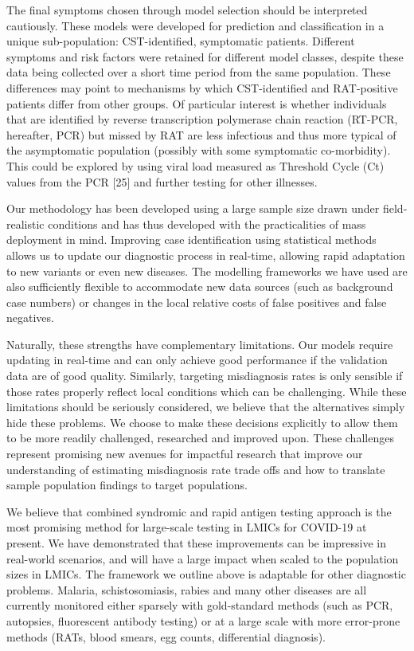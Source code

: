 \documentclass[]{elsarticle} %
\begin{document}
The final symptoms chosen through model selection should be interpreted cautiously.
These models were developed for prediction and classification in a unique sub-population: CST-identified, symptomatic patients.
Different symptoms and risk factors were retained for different model classes, despite these data being collected over a short time period from the same population.
These differences may point to mechanisms by which CST-identified and RAT-positive patients differ from other groups.
Of particular interest is whether individuals that are identified by reverse transcription polymerase chain reaction (RT-PCR, hereafter, PCR) but missed by RAT are less infectious and thus more typical of the asymptomatic population (possibly with some symptomatic co-morbidity).
This could be explored by using viral load measured as Threshold Cycle (Ct) values from the PCR {[}25{]} and further testing for other illnesses.

Our methodology has been developed using a large sample size drawn under field-realistic conditions and has thus developed with the practicalities of mass deployment in mind.
Improving case identification using statistical methods allows us to update our diagnostic process in real-time, allowing rapid adaptation to new variants or even new diseases.
The modelling frameworks we have used are also sufficiently flexible to accommodate new data sources (such as background case numbers) or changes in the local relative costs of false positives and false negatives.

Naturally, these strengths have complementary limitations.
Our models require updating in real-time and can only achieve good performance if the validation data are of good quality.
Similarly, targeting misdiagnosis rates is only sensible if those rates properly reflect local conditions which can be challenging.
While these limitations should be seriously considered, we believe that the alternatives simply hide these problems.
We choose to make these decisions explicitly to allow them to be more readily challenged, researched and improved upon.
These challenges represent promising new avenues for impactful research that improve our understanding of estimating misdiagnosis rate trade offs and how to translate sample population findings to target populations.

We believe that combined syndromic and rapid antigen testing approach is the most promising method for large-scale testing in LMICs for COVID-19 at present.
We have demonstrated that these improvements can be impressive in real-world scenarios, and will have a large impact when scaled to the population sizes in LMICs.
The framework we outline above is adaptable for other diagnostic problems.
Malaria, schistosomiasis, rabies and many other diseases are all currently monitored either sparsely with gold-standard methods (such as PCR, autopsies, fluorescent antibody testing) or at a large scale with more error-prone methods (RATs, blood smears, egg counts, differential diagnosis).
\end{document}
